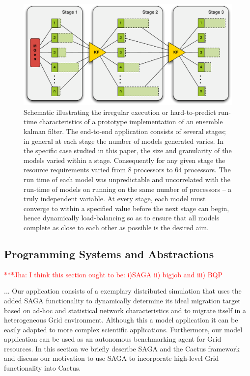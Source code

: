 \documentclass[conference,final]{IEEEtran}
\newcommand{\jhanote}[1]{ {\textcolor{red} { ***Jha: #1 }}}
\newcommand{\jhanote}[1]{}
\begin{document}
\begin{figure}
\begin{center}
\includegraphics*[scale=0.36,]{./figures/3StageKalmanFilter}
\end{center}
\caption{Schematic illustrating the irregular execution or
  hard-to-predict run-time characteristics of a prototype
  implementation of an ensemble kalman filter. The end-to-end
  application consists of several stages; in general at each stage the
  number of models generated varies. In the specific case studied in
  this paper, the size and granularity of the models varied within a
  stage. Consequently for any given stage the resource requirements
  varied from 8 processors to 64 processors.  The run time of each
  model was unpredictable and uncorrelated with the run-time of models
  on running on the same number of processors -- a truly independent
  variable. At every stage, each model must converge to within a
  specified value before the next stage can begin, hence dynamically
  load-balancing so as to ensure that all models complete as close to
  each other as possible is the desired aim.}
\label{fig:irregular_execution}
\end{figure}

\subsection{Programming Systems and Abstractions}

\jhanote{I think this section ought to be: i)SAGA ii) bigjob and iii) BQP }

... Our application
consists of a exemplary distributed simulation that uses the added
SAGA functionality to dynamically determine its ideal migration target
based on ad-hoc and statistical network characteristics and to migrate
itself in a heterogeneous Grid environment.  Although this a model
application it can be easily adapted to more complex scientific
applications.  Furthermore, our model application can be used as an
autonomous benchmarking agent for Grid resources. In this section we
briefly describe SAGA and the Cactus framework and discuss our
motivation to use SAGA to incorporate high-level Grid functionality
into Cactus.
\end{document}
